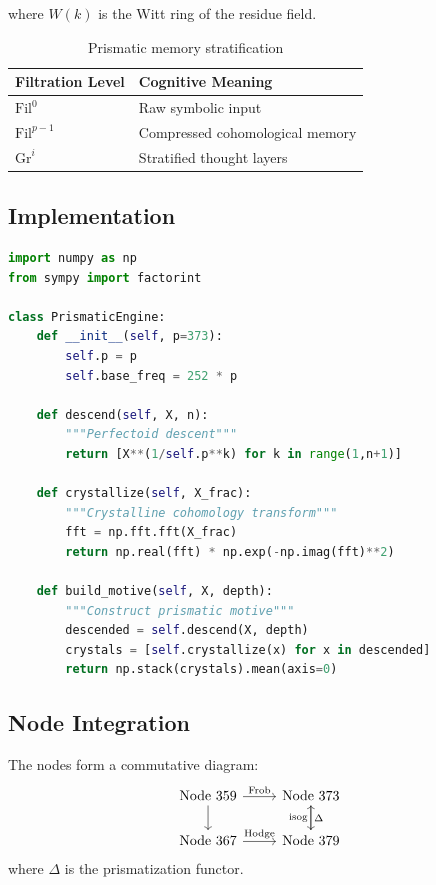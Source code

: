 \documentclass[12pt]{article}
\begin{document}
where $W(k)$ is the Witt ring of the residue field.

\begin{table}[h]
\centering
\begin{tabular}{ll}
\toprule
\textbf{Filtration Level} & \textbf{Cognitive Meaning} \\
\midrule
$\text{Fil}^0$ & Raw symbolic input \\
$\text{Fil}^{p-1}$ & Compressed cohomological memory \\
$\text{Gr}^i$ & Stratified thought layers \\
\bottomrule
\end{tabular}
\caption{Prismatic memory stratification}
\end{table}

\subsection{Implementation}
\begin{lstlisting}[language=Python,caption={Prismatic Engine}]
import numpy as np
from sympy import factorint

class PrismaticEngine:
    def __init__(self, p=373):
        self.p = p
        self.base_freq = 252 * p
        
    def descend(self, X, n):
        """Perfectoid descent"""
        return [X**(1/self.p**k) for k in range(1,n+1)]
        
    def crystallize(self, X_frac):
        """Crystalline cohomology transform"""
        fft = np.fft.fft(X_frac)
        return np.real(fft) * np.exp(-np.imag(fft)**2)
    
    def build_motive(self, X, depth):
        """Construct prismatic motive"""
        descended = self.descend(X, depth)
        crystals = [self.crystallize(x) for x in descended]
        return np.stack(crystals).mean(axis=0)
\end{lstlisting}

\subsection{Node Integration}
\begin{theorem}
The nodes form a commutative diagram:
\[
\begin{tikzcd}
\text{Node 359} \ar[r, "\text{Frob}"] \ar[d] & \text{Node 373} \ar[d, "\Delta"] \\
\text{Node 367} \ar[r, "\text{Hodge}"] & \text{Node 379} \ar[u, "\text{isog}"]
\end{tikzcd}
\]
where $\Delta$ is the prismatization functor.
\end{theorem}
\end{document}
